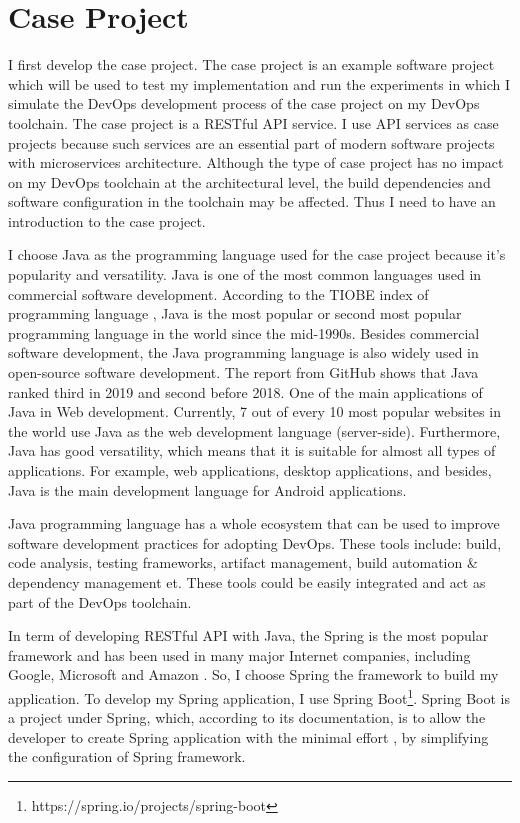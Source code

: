 \section{Case Project}
I first develop the case project. The case project is an example software project which will be used to test my implementation and run the experiments in which I simulate the DevOps development process of the case project on my DevOps toolchain. 
The case project is a RESTful API service. I use API services as case projects because such services are an essential part of modern software projects with microservices architecture. 
Although the type of case project has no impact on my DevOps toolchain at the architectural level, the build dependencies and software configuration in the toolchain may be affected. Thus I need to have an introduction to the case project.
\par
I choose Java as the programming language used for the case project because it's popularity and versatility.
Java is one of the most common languages used in commercial software development. According to the TIOBE index of programming language \cite{indexTIO42:online}, Java is the most popular or second most popular programming language in the world since the mid-1990s. Besides commercial software development, the Java programming language is also widely used in open-source software development. The report \cite{TheState3:online} from GitHub shows that Java ranked third in 2019 and second before 2018. One of the main applications of Java in Web development. Currently, 7 out of every 10 \cite{Programm17:online} most popular websites in the world use Java as the web development language (server-side). Furthermore, Java has good versatility, which means that it is suitable for almost all types of applications. For example, web applications, desktop applications, and besides, Java is the main development language for Android applications.
\par
Java programming language has a whole ecosystem that can be used to improve software development practices for adopting DevOps. These tools include: build, code analysis, testing frameworks, artifact management, build automation \& dependency management et. These tools could be easily integrated and act as part of the DevOps toolchain.
\par
In term of developing RESTful API with Java, the Spring is the most popular framework and has been used in many major Internet companies, including Google, Microsoft and Amazon \cite{SpringWh14:online}.
So, I choose Spring the framework to build my application. To develop my Spring application, I use Spring Boot\footnote{https://spring.io/projects/spring-boot}. Spring Boot is a project under Spring, which, according to its documentation, is to allow the developer to create Spring application with the minimal effort \cite{SpringBo84:online}, by simplifying the configuration of Spring framework.
